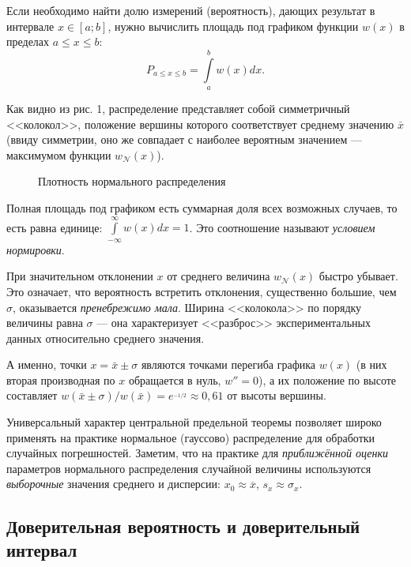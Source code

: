 \documentclass[10pt]{article}
\begin{document}
Если необходимо найти долю измерений (вероятность), дающих результат
в интервале $x\in\left[a;b\right]$, нужно вычислить площадь под графиком
функции $w\!\left(x\right)$ в пределах $a\le x\le b$:
\begin{equation}
    P_{a\le x\le b}=\int\limits _{a}^{b}w\!\left(x\right)dx.\label{eq:P}
\end{equation}

Как видно из рис. 1, распределение представляет собой симметричный
<<колокол>>, положение вершины которого
соответствует среднему значению $\bar{x}$ (ввиду симметрии, оно же
совпадает с наиболее вероятным значением --- максимумом
функции $w_{\mathcal{N}}(x)$).

\begin{figure}
    \caption{Плотность нормального распределения}
\end{figure}

Полная площадь под графиком есть суммарная доля всех возможных случаев,
то есть равна единице: $\int\limits _{-\infty}^{\infty}w\left(x\right)dx=1$.
Это соотношение называют \emph{условием нормировки}. 

При значительном отклонении $x$ от среднего величина $w_{\mathcal{N}}\!\left(x\right)$
быстро убывает. Это означает, что вероятность встретить отклонения,
существенно большие, чем $\sigma$, оказывается \emph{пренебрежимо
мала}. Ширина <<колокола>> по порядку величины
равна $\sigma$ --- она характеризует <<разброс>>
экспериментальных данных относительно среднего значения.

{\footnotesize{}А именно, точки $x=\bar{x}\pm\sigma$ являются точками
перегиба графика $w\left(x\right)$ (в них вторая производная по $x$
обращается в нуль, $w''=0$), а их положение по высоте составляет
$w\!\left(\bar{x}\pm\sigma\right)/w(\bar{x})=e^{_{-1/2}}\approx0{,}61$
от высоты вершины.}{\footnotesize\par}

Универсальный характер центральной предельной теоремы позволяет широко
применять на практике нормальное (гауссово) распределение для обработки
случайных погрешностей. Заметим, что на практике для \emph{приближённой
оценки} параметров нормального распределения случайной величины используются
\emph{выборочные} значения среднего и дисперсии: $x_{0}\approx\overline{x}$,
$s_{x}\approx\sigma_{x}$.

\subsection{Доверительная вероятность и доверительный интервал}
\end{document}
